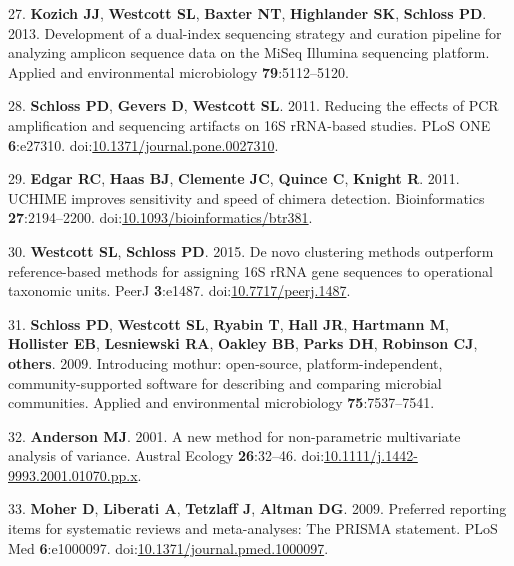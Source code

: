 \documentclass[12pt,]{article}
\begin{document}
\hypertarget{ref-Kozichux5f2013}{}
27. \textbf{Kozich JJ}, \textbf{Westcott SL}, \textbf{Baxter NT},
\textbf{Highlander SK}, \textbf{Schloss PD}. 2013. Development of a
dual-index sequencing strategy and curation pipeline for analyzing
amplicon sequence data on the MiSeq Illumina sequencing platform.
Applied and environmental microbiology \textbf{79}:5112--5120.

\hypertarget{ref-Schloss2011}{}
28. \textbf{Schloss PD}, \textbf{Gevers D}, \textbf{Westcott SL}. 2011.
Reducing the effects of PCR amplification and sequencing artifacts on
16S rRNA-based studies. PLoS ONE \textbf{6}:e27310.
doi:\href{https://doi.org/10.1371/journal.pone.0027310}{10.1371/journal.pone.0027310}.

\hypertarget{ref-Edgar2011}{}
29. \textbf{Edgar RC}, \textbf{Haas BJ}, \textbf{Clemente JC},
\textbf{Quince C}, \textbf{Knight R}. 2011. UCHIME improves sensitivity
and speed of chimera detection. Bioinformatics \textbf{27}:2194--2200.
doi:\href{https://doi.org/10.1093/bioinformatics/btr381}{10.1093/bioinformatics/btr381}.

\hypertarget{ref-Westcott2015}{}
30. \textbf{Westcott SL}, \textbf{Schloss PD}. 2015. De novo clustering
methods outperform reference-based methods for assigning 16S rRNA gene
sequences to operational taxonomic units. PeerJ \textbf{3}:e1487.
doi:\href{https://doi.org/10.7717/peerj.1487}{10.7717/peerj.1487}.

\hypertarget{ref-mothur}{}
31. \textbf{Schloss PD}, \textbf{Westcott SL}, \textbf{Ryabin T},
\textbf{Hall JR}, \textbf{Hartmann M}, \textbf{Hollister EB},
\textbf{Lesniewski RA}, \textbf{Oakley BB}, \textbf{Parks DH},
\textbf{Robinson CJ}, \textbf{others}. 2009. Introducing mothur:
open-source, platform-independent, community-supported software for
describing and comparing microbial communities. Applied and
environmental microbiology \textbf{75}:7537--7541.

\hypertarget{ref-Anderson2001}{}
32. \textbf{Anderson MJ}. 2001. A new method for non-parametric
multivariate analysis of variance. Austral Ecology \textbf{26}:32--46.
doi:\href{https://doi.org/10.1111/j.1442-9993.2001.01070.pp.x}{10.1111/j.1442-9993.2001.01070.pp.x}.

\hypertarget{ref-Moher2009}{}
33. \textbf{Moher D}, \textbf{Liberati A}, \textbf{Tetzlaff J},
\textbf{Altman DG}. 2009. Preferred reporting items for systematic
reviews and meta-analyses: The PRISMA statement. PLoS Med
\textbf{6}:e1000097.
doi:\href{https://doi.org/10.1371/journal.pmed.1000097}{10.1371/journal.pmed.1000097}.
\end{document}
